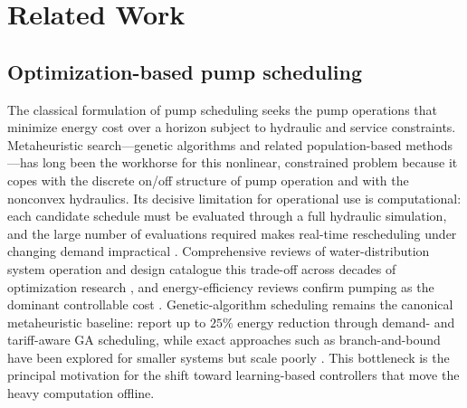 \documentclass[11pt,a4paper]{article}
\begin{document}
\section{Related Work}
\label{sec:related}

\subsection{Optimization-based pump scheduling}
The classical formulation of pump scheduling seeks the pump operations that
minimize energy cost over a horizon subject to hydraulic and service
constraints. Metaheuristic search---genetic algorithms and related
population-based methods---has long been the workhorse for this nonlinear,
constrained problem because it copes with the discrete on/off structure of pump
operation and with the nonconvex hydraulics. Its decisive limitation for
operational use is computational: each candidate schedule must be evaluated
through a full hydraulic simulation, and the large number of evaluations
required makes real-time rescheduling under changing demand impractical
\citep{Hu2023EPPO}. Comprehensive reviews of water-distribution system operation
and design catalogue this trade-off across decades of optimization research
\citep{Mala2016WDNoptReview,MalaJetmarova2018Design}, and energy-efficiency
reviews confirm pumping as the dominant controllable cost
\citep{Coelho2014Efficiency}. Genetic-algorithm scheduling remains the canonical
metaheuristic baseline: \citet{Luna2019Energy} report up to $25\%$ energy
reduction through demand- and tariff-aware GA scheduling, while exact approaches
such as branch-and-bound have been explored for smaller systems but scale poorly
\citep{Menke2016BnB}. This bottleneck is the principal motivation for the shift
toward learning-based controllers that move the heavy computation offline.
\end{document}
